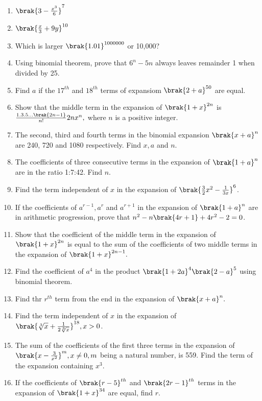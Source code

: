 \begin{enumerate}[label=\thesubsection.\arabic*, ref=\thesubsection.\theenumi,itemsep=1ex,resume*]
\item $\brak{3 - \frac{x^3}{6}}^7$
\item $\brak{\frac{x}{3} + 9y}^{10}$
\item Which is larger $\brak{1.01}^{1000000}$ or 10,000?
\item Using binomial theorem, prove that $6^n-5n$ always leaves remainder 1 when divided by 25.
\item Find $a$ if the $17^{th}$ and $18^{th}$ terms of expansiom $\brak{2+a}^{50}$ are equal.
\item Show that the middle term in the expansion of $\brak{1+x}^{2n} $ is  $\frac{1.3.5 \dots \brak{2n-1}}{n!}2n x^n,$ where $n$ is a positive integer.
\item The second, third and fourth terms in the binomial expansion $\brak{x+a}^n$ are 240, 720 and 1080 respectively. Find $x,a$ and $n$.
\item The coefficients of three consecutive terms in the expansion of $\brak{1+a}^n$ are in the ratio 1:7:42. Find $n$.
\item Find the term independent of $x$ in the expansion of $\brak{\frac{3}{2}x^2 - \frac{1}{3x}}^6$.
\item If the coefficients of $a^{r-1},a^r$ and $a^{r+1}$ in the expansion of $\brak{1+a}^n$ are in arithmetic progression, prove that $n^2 - n\brak{4r+1} + 4r^2 - 2 = 0$.
\item Show that the coefficient of the middle term in the expansion of $\brak{1+x}^{2n}$ is equal to the sum of the coefficients of two middle terms in the expansion of $\brak{1+x}^{2n-1}.$
\item Find the coefficient of $a^4$ in the product $\brak{1+2a}^4\brak{2-a}^5$ using binomial theorem.
\item Find thr $r^{th}$ term from the end in the expansion of $\brak{x+a}^n.$
\item Find the term independent of $x$ in the expansion of $\brak{\sqrt[3]{x} + \frac{1}{2\sqrt[3]{x}}}^{18}, x>0$.
\item The sum of the coefficients of the first three terms in the expansion of $\brak{x - \frac{3}{x^2}}^m, x\neq0, m$ being a natural number, is 559. Find the term of the expansion containing $x^3$.	
\item If the coefficients of $\brak{r-5}^{th}$ and  $\brak{2r-1}^{th}$ terms in the expansion of $\brak{1+x}^{34}$ are equal, find $r$.



\end{enumerate}
